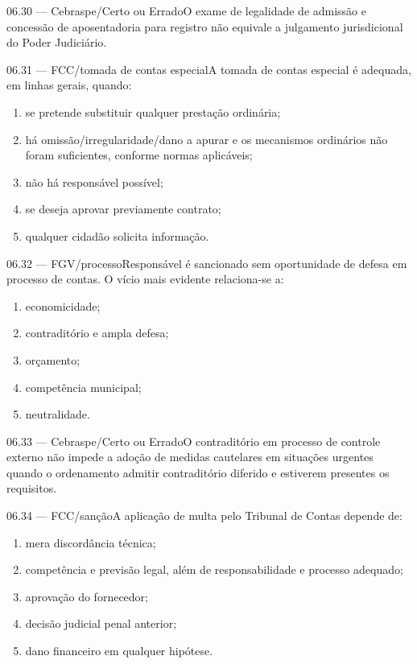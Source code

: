 \begin{questao}{ 06.30 — Cebraspe/Certo ou Errado}O exame de legalidade de admissão e concessão de aposentadoria para registro não equivale a julgamento jurisdicional do Poder Judiciário.\end{questao}
\begin{questao}{ 06.31 — FCC/tomada de contas especial}A tomada de contas especial é adequada, em linhas gerais, quando:\begin{enumerate}[label=\Alph*)]\item se pretende substituir qualquer prestação ordinária;\item há omissão/irregularidade/dano a apurar e os mecanismos ordinários não foram suficientes, conforme normas aplicáveis;\item não há responsável possível;\item se deseja aprovar previamente contrato;\item qualquer cidadão solicita informação.\end{enumerate}\end{questao}
\begin{questao}{ 06.32 — FGV/processo}Responsável é sancionado sem oportunidade de defesa em processo de contas. O vício mais evidente relaciona-se a:\begin{enumerate}[label=\Alph*)]\item economicidade;\item contraditório e ampla defesa;\item orçamento;\item competência municipal;\item neutralidade.\end{enumerate}\end{questao}
\begin{questao}{ 06.33 — Cebraspe/Certo ou Errado}O contraditório em processo de controle externo não impede a adoção de medidas cautelares em situações urgentes quando o ordenamento admitir contraditório diferido e estiverem presentes os requisitos.\end{questao}
\begin{questao}{ 06.34 — FCC/sanção}A aplicação de multa pelo Tribunal de Contas depende de:\begin{enumerate}[label=\Alph*)]\item mera discordância técnica;\item competência e previsão legal, além de responsabilidade e processo adequado;\item aprovação do fornecedor;\item decisão judicial penal anterior;\item dano financeiro em qualquer hipótese.\end{enumerate}\end{questao}
